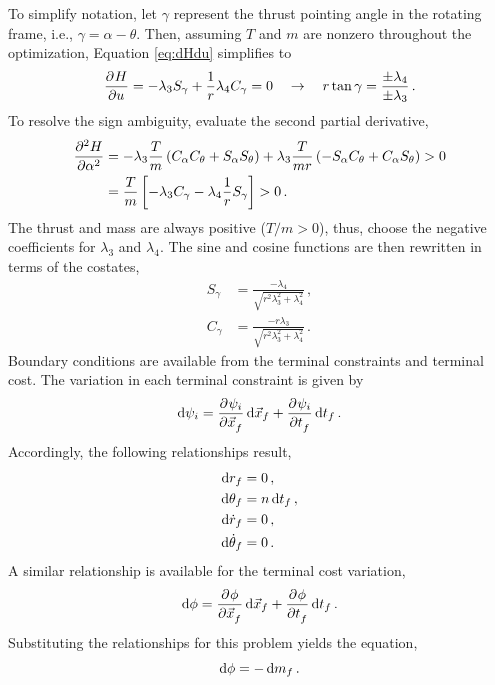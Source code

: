 \documentclass[conf]{new-aiaa}
\begin{document}
To simplify notation, let $\gamma$ represent the thrust pointing angle in the rotating frame, i.e., $\gamma = \alpha - \theta$. Then, assuming $T$ and $m$ are nonzero throughout the optimization, Equation \eqref{eq:dHdu} simplifies to
\begin{equation}
	\dpd{H}{u} = -\lambda_3 S_{\gamma} + \frac{1}{r}\lambda_4 C_{\gamma} = 0 \quad \to \quad r \tan \gamma = \frac{\pm \lambda_4}{\pm \lambda_3}\,.
\end{equation}
To resolve the sign ambiguity, evaluate the second partial derivative,
\begin{align}
	\dpd[2]{H}{\alpha} &= -\lambda_3 \frac{T}{m} \left(C_{\alpha} C_{\theta} + S_{\alpha} S_{\theta} \right) + \lambda_3 \frac{T}{mr} \left(-S_{\alpha} C_{\theta} + C_{\alpha} S_{\theta} \right) > 0\\
	&= \frac{T}{m} \left[ -\lambda_3 C_{\gamma} - \lambda_4 \frac{1}{r} S_{\gamma} \right] > 0\,.
\end{align}
The thrust and mass are always positive ($T/m > 0$), thus, choose the negative coefficients for $\lambda_3$ and $\lambda_4$. The sine and cosine functions are then rewritten in terms of the costates,
\begin{align}
	S_{\gamma} &= \frac{-\lambda_4}{\sqrt{r^2\lambda_3^2 + \lambda_4^2}}\,,\\
	C_{\gamma} &= \frac{-r \lambda_3}{\sqrt{r^2\lambda_3^2 + \lambda_4^2}}\,.
\end{align}
Boundary conditions are available from the terminal constraints and terminal cost. The variation in each terminal constraint is given by
\begin{equation}
	\dif \psi_i = \dpd{\psi_i}{\vec{x}_f} \dif \vec{x}_f + \dpd{\psi_i}{t_f} \dif t_f\,.
\end{equation}
Accordingly, the following relationships result,
\begin{align}
	\dif r_f &= 0\,,\\
	\dif \theta_f &= n \dif t_f\,,\\
	\dif \dot{r}_f &= 0\,,\\
	\dif \dot{\theta}_f &= 0\,.
\end{align}
A similar relationship is available for the terminal cost variation,
\begin{equation}
	\dif \phi = \dpd{\phi}{\vec{x}_f} \dif \vec{x}_f + \dpd{\phi}{t_f} \dif t_f\,.
\end{equation}
Substituting the relationships for this problem yields the equation,
\begin{equation}
	\dif \phi = -\dif m_f\,.
\end{equation}
\end{document}
